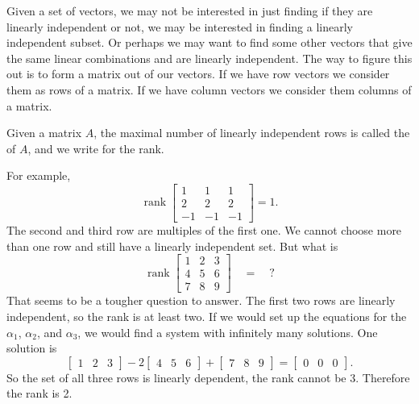 Given a set of vectors, we may not be interested in just finding if they
are linearly independent or not, we may be interested in finding a linearly
independent subset.  Or perhaps we may want to find some other vectors that
give the same linear combinations and are linearly independent.
The way to figure this out is to form a matrix out of our vectors.  If we
have row vectors we consider them as rows of a matrix.  If we have
column vectors we consider them columns of a matrix.


\begin{definition}
Given a matrix $A$, the maximal number of linearly independent rows is called
the \emph{} of $A$, and we write
 for the rank.
\end{definition}
For example,
\begin{equation*}
\operatorname{rank}
\begin{bmatrix}
1 & 1 & 1 \\
2 & 2 & 2 \\
-1 & -1 & -1
\end{bmatrix}
=
1 .
\end{equation*}
The second and third
row are multiples of the first one.  We cannot choose more than one row and
still have a linearly independent set.   But what is
\begin{equation*}
\operatorname{rank}
\begin{bmatrix}
1 & 2 & 3 \\
4 & 5 & 6 \\
7 & 8 & 9
\end{bmatrix} \quad = \quad ?
\end{equation*}
That seems to be a tougher question to answer.  The
first two rows are linearly independent, so the rank is at least
two.  If we would set up the equations for the $\alpha_1$, $\alpha_2$, and
$\alpha_3$, we would find a system with infinitely many solutions.  One
solution is
\begin{equation*}
\begin{bmatrix}
1 & 2 & 3
\end{bmatrix} -2
\begin{bmatrix}
4 & 5 & 6 
\end{bmatrix} +
\begin{bmatrix}
7 & 8 & 9
\end{bmatrix} =
\begin{bmatrix}
0 & 0 & 0
\end{bmatrix} .
\end{equation*}
So the set of all three rows is linearly dependent, the rank cannot be
3.  Therefore the rank is 2.

